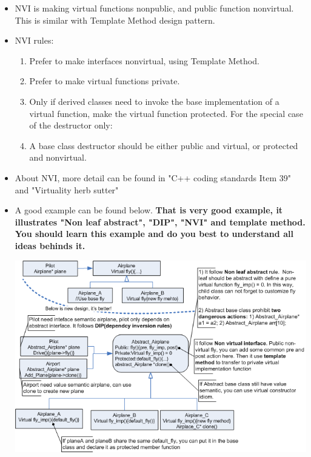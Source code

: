 \documentclass[a4paper,11pt,twoside]{book}
\begin{document}
\begin{itemize}
	\item NVI is making virtual functions nonpublic, and public function nonvirtual. This is similar with Template Method design pattern.  

\item NVI rules:
\begin{enumerate}
	\item Prefer to make interfaces nonvirtual, using Template Method.
	
	\item Prefer to make virtual functions private.
	
	\item Only if derived classes need to invoke the base implementation of a virtual function, make the virtual function protected. For the special case of the destructor only:
	
	\item A base class destructor should be either public and virtual, or protected and nonvirtual.
\end{enumerate}

    \item About NVI, more detail can be found in "C++ coding standards Item 39" and "Virtuality herb sutter"

    \item A good example can be found below. \textbf{That is very good example, it illustrates "Non leaf abstract", "DIP", "NVI" and template method. You should learn this example and do you best to understand all ideas behinds it. }

	\centering
	\includegraphics[width=0.93\linewidth]{pics/NVI.png}


\end{itemize}
\end{document}
